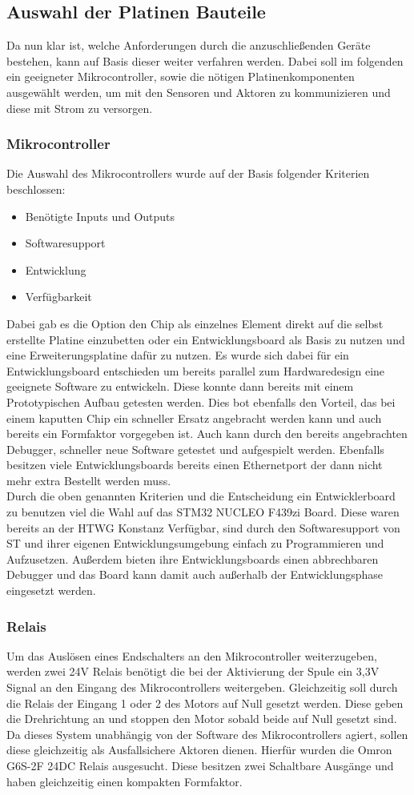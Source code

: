\subsection{Auswahl der Platinen Bauteile}
Da nun klar ist, welche Anforderungen durch die anzuschließenden Geräte bestehen, kann auf Basis dieser weiter verfahren werden. Dabei soll im folgenden ein geeigneter Mikrocontroller, sowie die nötigen Platinenkomponenten ausgewählt werden, um mit den Sensoren und Aktoren zu kommunizieren und diese mit Strom zu versorgen.
\subsubsection{Mikrocontroller}
Die Auswahl des Mikrocontrollers wurde auf der Basis folgender Kriterien beschlossen:
\begin{itemize}
	\item Benötigte Inputs und Outputs
	\item Softwaresupport 
	\item Entwicklung
	\item Verfügbarkeit
\end{itemize}
Dabei gab es die Option den Chip als einzelnes Element direkt auf die selbst erstellte Platine einzubetten oder ein Entwicklungsboard als Basis zu nutzen und eine Erweiterungsplatine dafür zu nutzen. Es wurde sich dabei für ein Entwicklungsboard entschieden um bereits parallel zum Hardwaredesign eine geeignete Software zu entwickeln. Diese konnte dann bereits mit einem Prototypischen Aufbau getesten werden. Dies bot ebenfalls den Vorteil, das bei einem kaputten Chip ein schneller Ersatz angebracht werden kann und auch bereits ein Formfaktor vorgegeben ist. Auch kann durch den bereits angebrachten Debugger, schneller neue Software getestet und aufgespielt werden. Ebenfalls besitzen viele Entwicklungsboards bereits einen Ethernetport der dann nicht mehr extra Bestellt werden muss.\\

\noindent Durch die oben genannten Kriterien und die Entscheidung ein Entwicklerboard zu benutzen viel die Wahl auf das STM32 NUCLEO F439zi Board. Diese waren bereits an der HTWG Konstanz Verfügbar, sind durch den Softwaresupport von ST und ihrer eigenen Entwicklungsumgebung einfach zu Programmieren und Aufzusetzen. Außerdem bieten ihre Entwicklungsboards einen abbrechbaren Debugger und das Board kann damit auch außerhalb der Entwicklungsphase eingesetzt werden.
\subsubsection{Relais}
Um das Auslösen eines Endschalters an den Mikrocontroller weiterzugeben, werden zwei 24V Relais benötigt die bei der Aktivierung der Spule ein 3,3V Signal an den Eingang des Mikrocontrollers weitergeben. Gleichzeitig soll durch die Relais der Eingang 1 oder 2 des Motors auf Null gesetzt werden. Diese geben die Drehrichtung an und stoppen den Motor sobald beide auf Null gesetzt sind. Da dieses System unabhängig von der Software des Mikrocontrollers agiert, sollen diese gleichzeitig als Ausfallsichere Aktoren dienen. Hierfür wurden die Omron G6S-2F 24DC Relais ausgesucht. Diese besitzen zwei Schaltbare Ausgänge und haben gleichzeitig einen kompakten Formfaktor.
